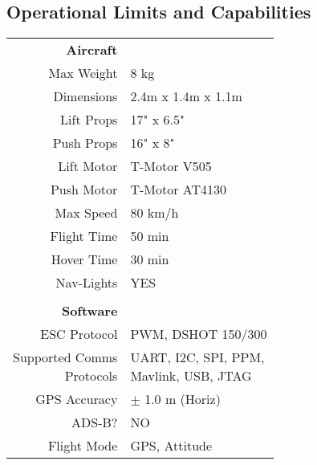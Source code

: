 \subsection{Operational Limits and Capabilities}
\label{sec:limits-and-capabilities}

\begin{table}[H]
\parbox[t][][t]{.45\linewidth}{
\centering
{
\renewcommand{\arraystretch}{1.82}
\begin{tabular}{r|l}
\color{hyperrideblue} \textbf{Aircraft} & \textbf{} \\
Max Weight & 8 kg \\
Dimensions & 2.4m x 1.4m x 1.1m \\
Lift Props & 17" x 6.5" \\
Push Props & 16" x 8" \\
Lift Motor & T-Motor V505 \\
Push Motor & T-Motor AT4130 \\
Max Speed & 80 km/h \\
Flight Time & 50 min \\
Hover Time & 30 min \\
Nav-Lights & YES \\
			&               \\
\color{hyperrideblue} \textbf{Software} &  \\
ESC Protocol & PWM, DSHOT 150/300 \\
\Longunderstack[r]{Supported Comms\\Protocols} & \Longunderstack[l]{UART, I2C, SPI, PPM,\\Mavlink, USB, JTAG} \\
GPS Accuracy & $\pm$ 1.0 m (Horiz) \\
ADS-B? & NO \\
Flight Mode & GPS, Attitude \\


\end{tabular}}}
\end{table}

